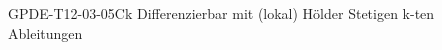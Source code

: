 
\begin{DEF}{GPDE-T12-03-05}{Ck Differenzierbar mit (lokal) Hölder Stetigen k-ten Ableitungen}
\end{DEF}
